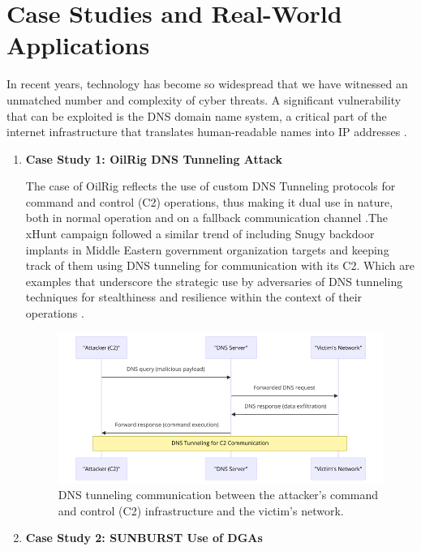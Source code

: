\section{Case Studies and Real-World Applications}

In recent years, technology has become so widespread that we have witnessed an unmatched number and complexity of cyber threats. A significant vulnerability that can be exploited is the DNS domain name system, a critical part of the internet infrastructure that translates human-readable names into IP addresses \cite{kumari2021sac115}. 

\begin{enumerate} 

\item\textbf{ Case Study 1: OilRig DNS Tunneling Attack }

The case of OilRig reflects the use of custom DNS Tunneling protocols for command and control (C2) operations, thus making it dual use in nature, both in normal operation and on a fallback communication channel \cite{paloaltonetworks2021dnsattacks}.The xHunt campaign \cite{unit42_xhunt_2021} followed a similar trend of including Snugy backdoor implants in Middle Eastern government organization targets and keeping track of them using DNS tunneling for communication with its C2.  Which are examples that underscore the strategic use by adversaries of DNS tunneling techniques for stealthiness and resilience within the context of their operations  \cite{unit42_2021}.

\captionsetup{font= footnotesize}
\begin{figure}[H]
    \centering
    \includegraphics[width=0.8\linewidth]{background/DNSTuu.png}
    \caption{DNS tunneling communication between the attacker's command and control (C2) infrastructure and the victim's network.}
    \label{fig:figTen}
\end{figure}



\item\textbf{ Case Study 2: SUNBURST Use of DGAs}


\end{enumerate}
